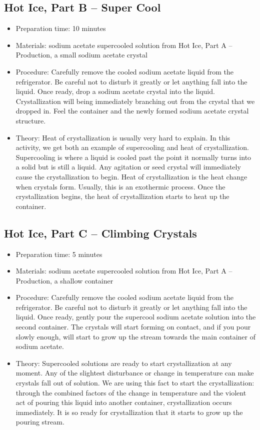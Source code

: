\subsection{Hot Ice, Part B -- Super Cool}
\begin{itemize}
\item{Preparation time: 10 minutes}
\item{Materials: sodium acetate supercooled solution from Hot Ice, Part A -- Production, a small sodium acetate crystal}
\item{Procedure: Carefully remove the cooled sodium acetate liquid from the refrigerator. Be careful not to disturb it greatly or let anything fall into the liquid. Once ready, drop a sodium acetate crystal into the liquid. Crystallization will being immediately branching out from the crystal that we dropped in. Feel the container and the newly formed sodium acetate crystal structure.}
\item{Theory: Heat of crystallization is usually very hard to explain. In this activity, we get both an example of supercooling and heat of crystallization. Supercooling is where a liquid is cooled past the point it normally turns into a solid but is still a liquid. Any agitation or seed crystal will immediately cause the crystallization to begin. Heat of crystallization is the heat change when crystals form. Usually, this is an exothermic process. Once the crystallization begins, the heat of crystallization starts to heat up the container.}
\end{itemize}

\subsection{Hot Ice, Part C -- Climbing Crystals}
\begin{itemize}
\item{Preparation time: 5 minutes}
\item{Materials: sodium acetate supercooled solution from Hot Ice, Part A -- Production, a shallow container}
\item{Procedure: Carefully remove the cooled sodium acetate liquid from the refrigerator. Be careful not to disturb it greatly or let anything fall into the liquid. Once ready, gently pour the supercool sodium acetate solution into the second container. The crystals will start forming on contact, and if you pour slowly enough, will start to grow up the stream towards the main container of sodium acetate.}
\item{Theory: Supercooled solutions are ready to start crystallization at any moment. Any of the slightest disturbance or change in temperature can make crystals fall out of solution. We are using this fact to start the crystallization: through the combined factors of the change in temperature and the violent act of pouring this liquid into another container, crystallization occurs immediately. It is so ready for crystallization that it starts to grow up the pouring stream.}
\end{itemize}

